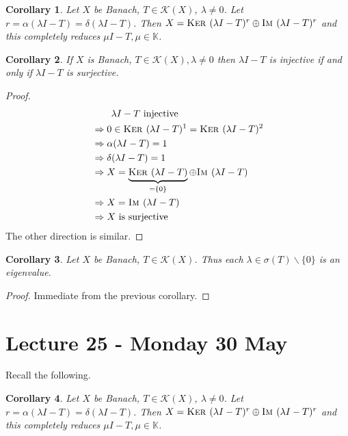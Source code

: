 \documentclass[10pt, reqno, oneside]{amsart}
\theoremstyle{plain}%
\newtheorem*{cor}{Corollary}
\theoremstyle{definition}
\theoremstyle{remark}
\newcommand{\K}{\mathbb{K}}
\newcommand{\im}{\textsc{Im\ }}
\renewcommand{\ker}{\textsc{Ker\ }}
\begin{document}
\begin{cor}
	Let $X$ be Banach, $T \in \mathcal K(X)$, $\lambda \neq 0$.  Let $r = \alpha(\lambda I - T) = \delta(\lambda I - T)$.  Then $X = \ker(\lambda I - T)^r \oplus \im(\lambda I - T)^r$ and this completely reduces $\mu I - T, \mu \in \K$.
\end{cor}

\begin{cor}
	If $X$ is Banach, $T \in \mathcal K(X), \lambda \neq 0$ then $\lambda I - T$ is injective if and only if $\lambda I - T$ is surjective.  
\end{cor}

\begin{proof}
	\begin{align*}
		&\qquad 		\text{$\lambda I - T$ injective} \\
		&\Rightarrow 0 \in \ker(\lambda I - T)^1 = \ker(\lambda I - T)^2 \\
		&\Rightarrow \alpha(\lambda I - T) = 1 \\
		&\Rightarrow \delta(\lambda I - T) = 1 \\
		&\Rightarrow X = \underbrace{\ker(\lambda I - T)}_{= \{ 0 \}} \oplus \im(\lambda I - T) \\
		&\Rightarrow X = \im (\lambda I - T) \\
		&\Rightarrow \text{$X$ is surjective}
	\end{align*}  The other direction is similar.
\end{proof}

\begin{cor}
	Let $X$ be Banach, $T \in \mathcal K(X)$.  Thus each $\lambda \in \sigma(T) \backslash \{ 0 \}$ is an eigenvalue.  
\end{cor}
\begin{proof}
	Immediate from the previous corollary.
\end{proof}




\section{Lecture 25 - Monday 30 May} %
\label{sec:lecture_25_monday_30_may}
Recall the following.
\begin{cor}
	Let $X$ be Banach, $T \in \mathcal K(X)$, $\lambda \neq 0$.  Let $r = \alpha(\lambda I - T) = \delta(\lambda I - T)$.  Then $X = \ker(\lambda I - T)^r \oplus \im(\lambda I - T)^r$ and this completely reduces $\mu I - T, \mu \in \K$.
\end{cor}
\end{document}
